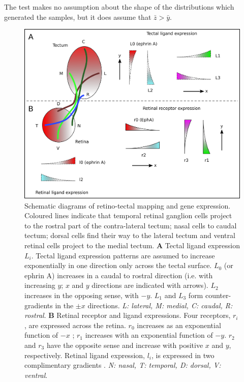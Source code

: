 \documentclass[11pt, a4paper]{article}
\begin{document}
The test makes no assumption about the shape of the distributions which generated the samples, but it does assume that $\bar{z} > \bar{y}$.

%
%

\begin{figure}
\includegraphics[width=\linewidth]{./images/expressions_fig.png}
\caption{Schematic diagrams of retino-tectal mapping and gene expression. Coloured lines indicate that temporal retinal ganglion cells project to the rostral part of the contra-lateral tectum; nasal cells to caudal tectum; dorsal cells find their way to the lateral tectum and ventral retinal cells project to the medial tectum.
%
\textbf{A} Tectal ligand expression $L_i$. Tectal ligand expression patterns are assumed to increase exponentially in one direction only across the tectal surface. $L_0$ (or ephrin A) increases in a caudal to rostral direction (i.e. with increasing $y$; $x$ and $y$ directions are indicated with arrows). $L_2$ increases in the opposing sense, with $-y$. $L_1$ and $L_3$ form counter-gradients in the $\pm x$ directions.
\emph{L: lateral, M: medial, C: caudal, R: rostral}.
%
\textbf{B} Retinal receptor and ligand expressions. Four receptors, $r_i$, are expressed across the retina. $r_0$ increases as an exponential function of $-x$ ; $r_1$ increases with an exponential function of $-y$. $r_2$ and $r_3$ have the opposite sense and increase with positive $x$ and $y$, respectively. Retinal ligand expression, $l_i$, is expressed in two complimentary gradients \citep{hornberger_modulation_1999}.
 \emph{N: nasal, T: temporal, D: dorsal, V: ventral}.
%
}
\label{f:ex}
\end{figure}
\end{document}
